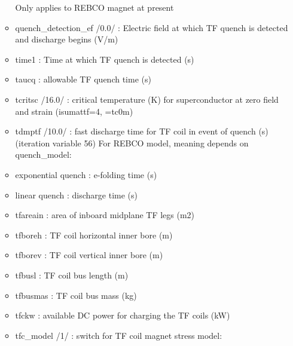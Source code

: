 \documentclass[
]{article}
\begin{document}
\begin{itemize}
\begin{itemize}
    Only applies to REBCO magnet at present
  \item
    quench\_detection\_ef /0.0/ : Electric field at which TF quench is
    detected and discharge begins (V/m)
  \item
    time1 : Time at which TF quench is detected (s)
  \item
    taucq : allowable TF quench time (s)
  \item
    tcritsc /16.0/ : critical temperature (K) for superconductor at zero
    field and strain (isumattf=4, =tc0m)
  \item
    tdmptf /10.0/ : fast discharge time for TF coil in event of quench
    (s) (iteration variable 56) For REBCO model, meaning depends on
    quench\_model:
  \item
    exponential quench : e-folding time (s)
  \item
    linear quench : discharge time (s)
  \item
    tfareain : area of inboard midplane TF legs (m2)
  \item
    tfboreh : TF coil horizontal inner bore (m)
  \item
    tfborev : TF coil vertical inner bore (m)
  \item
    tfbusl : TF coil bus length (m)
  \item
    tfbusmas : TF coil bus mass (kg)
  \item
    tfckw : available DC power for charging the TF coils (kW)
  \item
    tfc\_model /1/ : switch for TF coil magnet stress model:


\end{itemize}
\end{itemize}
\end{document}
